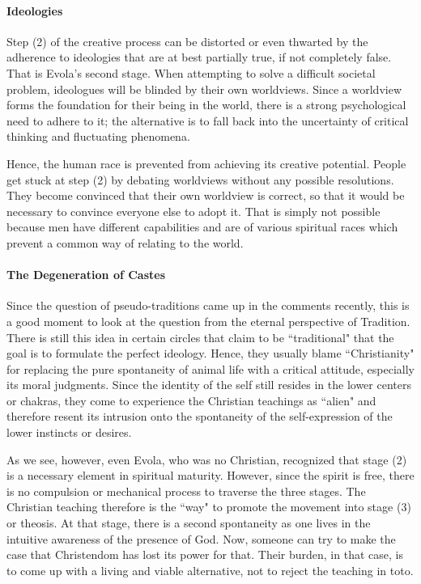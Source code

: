 \paragraph{Ideologies}
Step (2) of the creative process can be distorted or even thwarted by the adherence to ideologies that are at best partially true, if not completely false. That is Evola's second stage. When attempting to solve a difficult societal problem, ideologues will be blinded by their own worldviews. Since a worldview forms the foundation for their being in the world, there is a strong psychological need to adhere to it; the alternative is to fall back into the uncertainty of critical thinking and fluctuating phenomena.

Hence, the human race is prevented from achieving its creative potential. People get stuck at step (2) by debating worldviews without any possible resolutions. They become convinced that their own worldview is correct, so that it would be necessary to convince everyone else to adopt it. That is simply not possible because men have different capabilities and are of various spiritual races which prevent a common way of relating to the world.

\paragraph{The Degeneration of Castes}
Since the question of pseudo-traditions came up in the comments recently, this is a good moment to look at the question from the eternal perspective of Tradition. There is still this idea in certain circles that claim to be ``traditional" that the goal is to formulate the perfect ideology. Hence, they usually blame ``Christianity" for replacing the pure spontaneity of animal life with a critical attitude, especially its moral judgments. Since the identity of the self still resides in the lower centers or chakras, they come to experience the Christian teachings as ``alien" and therefore resent its intrusion onto the spontaneity of the self-expression of the lower instincts or desires.

As we see, however, even Evola, who was no Christian, recognized that stage (2) is a necessary element in spiritual maturity. However, since the spirit is free, there is no compulsion or mechanical process to traverse the three stages. The Christian teaching therefore is the ``way" to promote the movement into stage (3) or theosis. At that stage, there is a second spontaneity as one lives in the intuitive awareness of the presence of God. Now, someone can try to make the case that Christendom has lost its power for that. Their burden, in that case, is to come up with a living and viable alternative, not to reject the teaching in toto.

